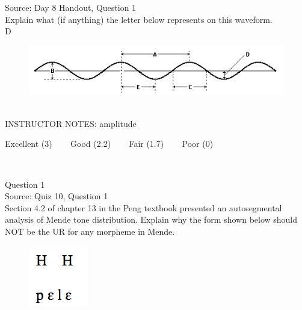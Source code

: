 \documentclass[12pt]{article}
\begin{document}
Source: Day 8 Handout, Question 1\\

Explain what (if anything) the letter below represents on this waveform.\\

D

\begin{figure}[H]
\includegraphics{../images/sinusoid.png}
\end{figure}

~\\
INSTRUCTOR NOTES: amplitude


\vfill
Excellent (3) ~~~ Good (2.2) ~~~ Fair (1.7) ~~~ Poor (0)
\newpage

\begin{center}
\textbf{{\color{red}{\HUGE END OF EXAM}}}\\

\end{center}
\newpage

\begin{center}
\textbf{{\color{blue}{\HUGE START OF EXAM\\}}}

\textbf{{\color{blue}{\HUGE Student ID: 6801\\}}}

\textbf{{\color{blue}{\HUGE 3:00 - 3:20 PM\\}}}

\end{center}
\newpage

{\large Question 1}\\

Source: Quiz 10, Question 1\\

Section 4.2 of chapter 13 in the Peng textbook presented an autosegmental analysis of Mende tone distribution. Explain why the form shown below should NOT be the UR for any morpheme in Mende.\\

\begin{figure}[H]
\includegraphics{../images/mende_house_b.png}
\end{figure}
\end{document}
